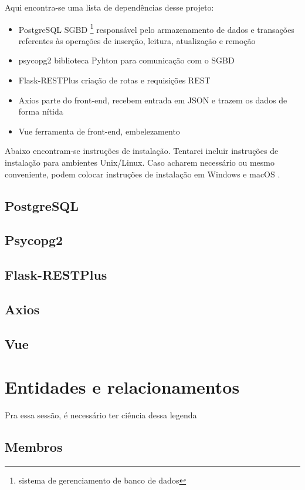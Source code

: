 \documentclass[11pt]{article}
\newcommand{\codigo}[3]{}
\begin{document}
    Aqui encontra-se uma lista de dependências desse projeto:
    \begin{itemize}
        \item PostgreSQL \dir SGBD \footnote{sistema de gerenciamento de banco de dados}
        responsável pelo armazenamento de dados e transações referentes às operações de
        inserção, leitura, atualização e remoção
        \item psycopg2 \dir biblioteca Pyhton para comunicação com o SGBD
        \item Flask-RESTPlus \dir criação de rotas e requisições REST
        \item Axios \dir parte do front-end, recebem entrada em JSON e trazem os dados de
        forma nítida
        \item Vue \dir ferramenta de front-end, embelezamento
    \end{itemize}
    Abaixo encontram-se instruções de instalação. Tentarei incluir instruções de instalação
    para ambientes Unix/Linux. Caso acharem necessário ou mesmo conveniente, podem colocar
    instruções de instalação em Windows e macOS .

        \subsection{PostgreSQL}
        \subsection{Psycopg2}
        \subsection{Flask-RESTPlus}
        \subsection{Axios}
        \subsection{Vue}

    \section[Descrição]{Entidades e relacionamentos}

        Pra essa sessão, é necessário ter ciência dessa legenda
        \legenda

        \subsection{Membros}
            \codigo{3}{17}{Membros}
\end{document}
